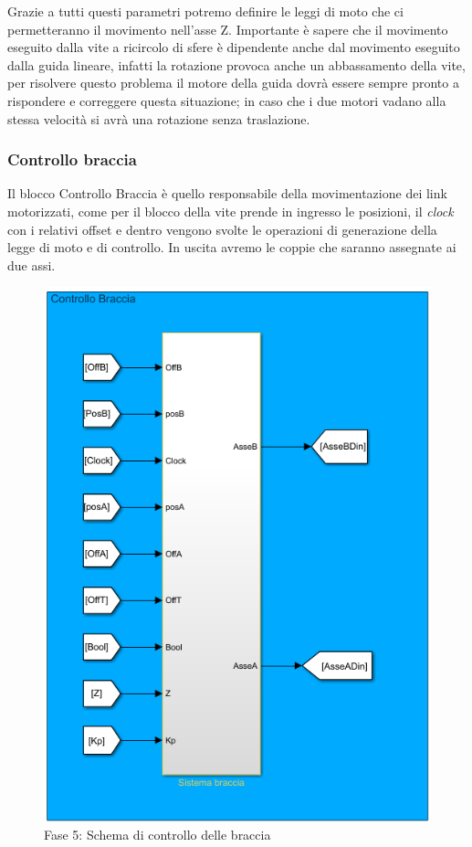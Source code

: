 Grazie a tutti questi parametri potremo definire le leggi di moto che ci permetteranno il movimento nell'asse Z. Importante è sapere che il movimento eseguito dalla vite a ricircolo di sfere è dipendente anche dal movimento eseguito dalla guida lineare, infatti la rotazione provoca anche un abbassamento della vite, per risolvere questo problema il motore della guida dovrà essere sempre pronto a rispondere e correggere questa situazione; in caso che i due motori vadano alla stessa velocità si avrà una rotazione senza traslazione.
\subsubsection*{Controllo braccia}
Il blocco Controllo Braccia è quello responsabile della movimentazione dei link motorizzati, come per il blocco della vite prende in ingresso le posizioni, il \textit{clock} con i relativi offset e dentro vengono svolte le operazioni di generazione della legge di moto e di controllo. In uscita avremo le coppie che saranno assegnate ai due assi.
\begin{figure}[ht]
	\begin{center}
		\includegraphics[scale=0.75]{Immagini/Sperimentale/ControlloBraccia}
		\caption{Fase 5: Schema di controllo delle braccia}
		\label{fig:controlloBraccia}
	\end{center}
\end{figure}
